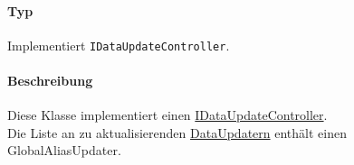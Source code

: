 \paragraph*{Typ}
Implementiert \texttt{IDataUpdateController}.
\paragraph*{Beschreibung}
Diese Klasse implementiert einen \href{App_DocumentViewer_IDataupdateController}{IDataUpdateController}.\\
Die Liste an zu aktualisierenden \hyperref[App_DocumentViewer_DataUpdater]{DataUpdatern} enthält einen GlobalAliasUpdater.